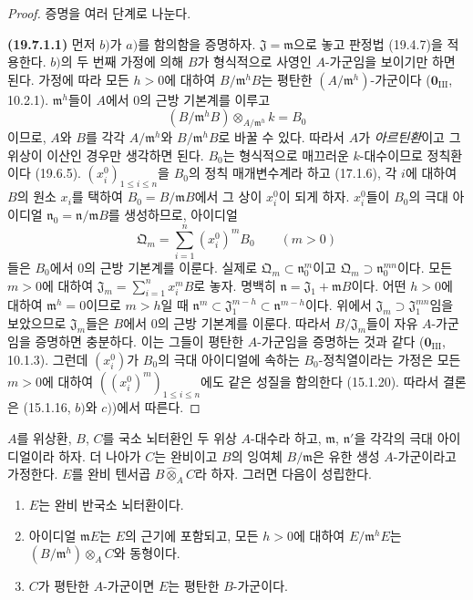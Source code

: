 \begin{proof}
증명을 여러 단계로 나눈다.

\medskip
\noindent{}\label{0.19.7.1.1-ko}\textbf{(19.7.1.1)}\enspace
먼저 $b)$가 $a)$를 함의함을 증명하자. $\mathfrak J=\mathfrak m$으로
놓고 판정법 (19.4.7)을 적용한다. $b)$의 두 번째 가정에 의해 $B$가
형식적으로 사영인 $A$-가군임을 보이기만 하면 된다. 가정에 따라 모든
$h>0$에 대하여 $B/\mathfrak m^hB$는 평탄한
$(A/\mathfrak m^h)$-가군이다 ($\mathbf 0_{\mathrm{III}}$, 10.2.1).
$\mathfrak m^h$들이 $A$에서 $0$의 근방 기본계를 이루고
\[
  (B/\mathfrak m^hB)\otimes_{A/\mathfrak m^h}k=B_0
\]
이므로, $A$와 $B$를 각각 $A/\mathfrak m^h$와
$B/\mathfrak m^hB$로 바꿀 수 있다. 따라서 $A$가 \emph{아르틴환}이고
그 위상이 이산인 경우만 생각하면 된다. $B_0$는 형식적으로 매끄러운
$k$-대수이므로 정칙환이다 (19.6.5). $(x_i^0)_{1\leq i\leq n}$을
$B_0$의 정칙 매개변수계라 하고 (17.1.6), 각 $i$에 대하여 $B$의 원소
$x_i$를 택하여 $B_0=B/\mathfrak mB$에서 그 상이 $x_i^0$이 되게 하자.
$x_i^0$들이 $B_0$의 극대 아이디얼
$\mathfrak n_0=\mathfrak n/\mathfrak mB$를 생성하므로, 아이디얼
\[
  \mathfrak Q_m=\sum_{i=1}^n(x_i^0)^mB_0 \qquad (m>0)
\]
들은 $B_0$에서 $0$의 근방 기본계를 이룬다. 실제로
$\mathfrak Q_m\subset\mathfrak n_0^m$이고
$\mathfrak Q_m\supset\mathfrak n_0^{mn}$이다. 모든 $m>0$에 대하여
$\mathfrak J_m=\sum_{i=1}^n x_i^mB$로 놓자. 명백히
$\mathfrak n=\mathfrak J_1+\mathfrak mB$이다. 어떤 $h>0$에 대하여
$\mathfrak m^h=0$이므로 $m>h$일 때
$\mathfrak n^m\subset\mathfrak J_1^{m-h}
\subset\mathfrak n^{m-h}$이다. 위에서
$\mathfrak J_m\supset\mathfrak J_1^{mn}$임을 보았으므로
$\mathfrak J_m$들은 $B$에서 $0$의 근방 기본계를 이룬다. 따라서
$B/\mathfrak J_m$들이 자유 $A$-가군임을 증명하면 충분하다. 이는
그들이 평탄한 $A$-가군임을 증명하는 것과 같다
($\mathbf 0_{\mathrm{III}}$, 10.1.3). 그런데 $(x_i^0)$가 $B_0$의 극대
아이디얼에 속하는 $B_0$-정칙열이라는 가정은 모든 $m>0$에 대하여
$((x_i^0)^m)_{1\leq i\leq n}$에도 같은 성질을 함의한다 (15.1.20).
따라서 결론은 (15.1.16, $b)$와 $c)$)에서 따른다.
\end{proof}

\begin{lemma}[19.7.1.2]
\label{0.19.7.1.2-ko}
$A$를 위상환, $B$, $C$를 국소 뇌터환인 두 위상 $A$-대수라 하고,
$\mathfrak m$, $\mathfrak n'$을 각각의 극대 아이디얼이라 하자. 더
나아가 $C$는 완비이고 $B$의 잉여체 $B/\mathfrak m$은 유한 생성
$A$-가군이라고 가정한다. $E$를 완비 텐서곱
$B\widehat\otimes_A C$라 하자. 그러면 다음이 성립한다.
\begin{enumerate}
  \item[(i)] $E$는 완비 반국소 뇌터환이다.
  \item[(ii)] 아이디얼 $\mathfrak mE$는 $E$의 근기에 포함되고, 모든
  $h>0$에 대하여 $E/\mathfrak m^hE$는
  $(B/\mathfrak m^h)\otimes_A C$와 동형이다.
  \item[(iii)] $C$가 평탄한 $A$-가군이면 $E$는 평탄한 $B$-가군이다.
\end{enumerate}
\end{lemma}

